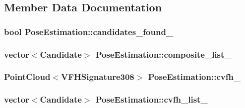\subsection{Member Data Documentation}
\hypertarget{classPoseEstimation_aa9c90e1b5d640638bdb2f48bd9b9df11}{
\subsubsection[{candidates\-\_\-found\-\_\-}]{\setlength{\rightskip}{0pt plus 5cm}bool Pose\-Estimation\-::candidates\-\_\-found\-\_\-\hspace{0.3cm}{\ttfamily [private]}}}\label{classPoseEstimation_aa9c90e1b5d640638bdb2f48bd9b9df11}
\hypertarget{classPoseEstimation_a72f85d5bdac0049b35cf932715505f1d}{
\subsubsection[{composite\-\_\-list\-\_\-}]{\setlength{\rightskip}{0pt plus 5cm}vector$<${\bf Candidate}$>$ Pose\-Estimation\-::composite\-\_\-list\-\_\-\hspace{0.3cm}{\ttfamily [private]}}}\label{classPoseEstimation_a72f85d5bdac0049b35cf932715505f1d}
\hypertarget{classPoseEstimation_a017646ee04a177539a060ab4bd2471f6}{
\subsubsection[{cvfh\-\_\-}]{\setlength{\rightskip}{0pt plus 5cm}Point\-Cloud$<$V\-F\-H\-Signature308$>$ Pose\-Estimation\-::cvfh\-\_\-\hspace{0.3cm}{\ttfamily [private]}}}\label{classPoseEstimation_a017646ee04a177539a060ab4bd2471f6}
\hypertarget{classPoseEstimation_a173da6a606273315659157e43fe4c3ef}{
\subsubsection[{cvfh\-\_\-list\-\_\-}]{\setlength{\rightskip}{0pt plus 5cm}vector$<${\bf Candidate}$>$ Pose\-Estimation\-::cvfh\-\_\-list\-\_\-\hspace{0.3cm}{\ttfamily [private]}}}\label{classPoseEstimation_a173da6a606273315659157e43fe4c3ef}
